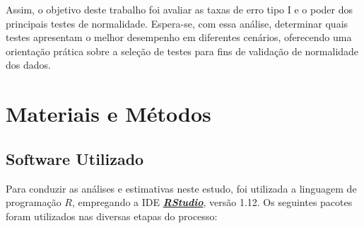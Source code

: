 \documentclass[a4paper,11pt]{article} %
\begin{document}
\vspace{0.5cm}

Assim, o objetivo deste trabalho foi avaliar as taxas de erro tipo I e o poder dos principais testes de normalidade. Espera-se, com essa análise, determinar quais testes apresentam o melhor desempenho em diferentes cenários, oferecendo uma orientação prática sobre a seleção de testes para fins de validação de normalidade dos dados.

\section{Materiais e Métodos} %
\subsection{Software Utilizado} %

Para conduzir as análises e estimativas neste estudo, foi utilizada a linguagem de programação $R$, empregando a IDE \href{https://posit.co/download/rstudio-desktop/}{\textit{\textbf{RStudio}}}, versão 1.12. Os seguintes pacotes foram utilizados nas diversas etapas do processo:
\end{document}
